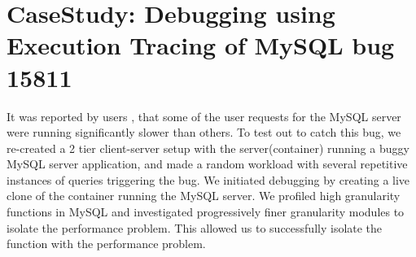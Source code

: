 

\section{CaseStudy: Debugging using Execution Tracing of MySQL bug 15811}  
It was reported by users \cite{mysqlbug}, that some of the user requests for the MySQL server were running significantly slower than others.
To test out \parikshan to catch this bug, we re-created a 2 tier client-server setup with the server(container) running a buggy MySQL server application, and made a random workload with several repetitive instances of queries triggering the bug.
We initiated debugging by creating a live clone of the container running the MySQL server.
We profiled high granularity functions in MySQL and investigated progressively finer granularity modules to isolate the performance problem.
This allowed us to successfully isolate the function with the performance problem.

